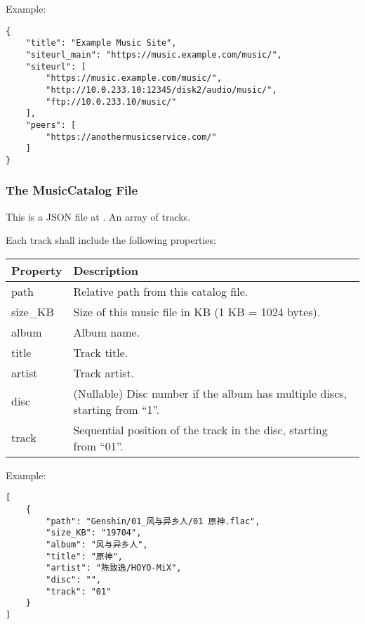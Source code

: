 \documentclass[a4paper,11pt]{article}
\begin{document}
Example:

\begin{lstlisting}
{
    "title": "Example Music Site",
    "siteurl_main": "https://music.example.com/music/",
    "siteurl": [
        "https://music.example.com/music/",
        "http://10.0.233.10:12345/disk2/audio/music/",
        "ftp://10.0.233.10/music/"
    ],
    "peers": [
        "https://anothermusicservice.com/"
    ]
}
\end{lstlisting}

\subsubsection{The MusicCatalog File}

This is a JSON file at . An array of tracks.

Each track shall include the following properties:

\begin{tabu}{|l|X|}
	\hline
	{Property} & {Description}                                                                  \\
	\hline
	{path}     & {Relative path from this catalog file.}                                        \\
	{size\_KB} & {Size of this music file in KB (1 KB = 1024 bytes).}                           \\
	{album}    & {Album name.}                                                                  \\
	{title}    & {Track title.}                                                                 \\
	{artist}   & {Track artist.}                                                                \\
	{disc}     & {(Nullable) Disc number if the album has multiple discs, starting from ``1''.} \\
	{track}    & {Sequential position of the track in the disc, starting from ``01''.}          \\
	\hline
\end{tabu}

Example:

\begin{lstlisting}
[
    {
        "path": "Genshin/01_风与异乡人/01 原神.flac",
        "size_KB": "19704",
        "album": "风与异乡人",
        "title": "原神",
        "artist": "陈致逸/HOYO-MiX",
        "disc": "",
        "track": "01"
    }
]
\end{lstlisting}
\end{document}
